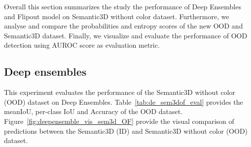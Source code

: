     Overall this section summarizes the study the performance of Deep Ensembles and Flipout model on Semantic3D without color dataset.
    Furthermore, we analyse and compare the probabilities and entropy scores of the new OOD and Semantic3D dataset.
    Finally, we visualize and evaluate the performance of OOD detection using AUROC score as evaluation metric.
    \subsection{Deep ensembles}
    This experiment evaluates the performance of the Semantic3D without color (OOD) dataset on Deep Ensembles.
    Table~\ref{tab:de_sem3dof_eval} provides the meanIoU, per-class IoU and Accuracy of the OOD dataset.
    Figure~\ref{fig:deepensemble_vis_sem3d_OF} provide the visual comparison of predictions between the Semantic3D (ID) and Semantic3D without color (OOD) dataset.

